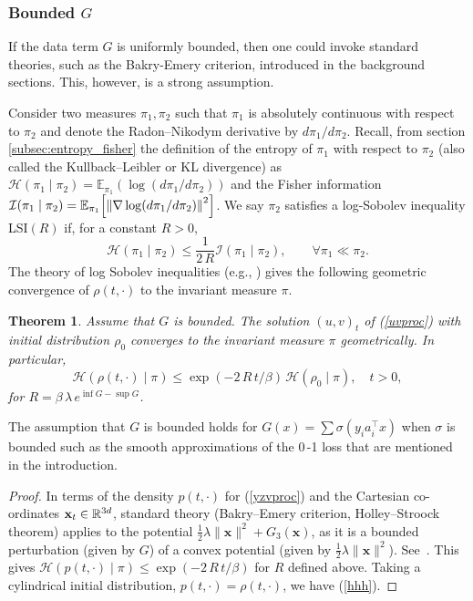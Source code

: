 \documentclass[11pt, twoside]{report}
\newtheorem{theorem}{Theorem}[section]
\renewcommand{\vec}[1]{{\mathbf{#1}}}
\begin{document}
\subsubsection{Bounded \texorpdfstring{$G$}{G}}
If the data term $G$ is uniformly bounded, then one could invoke standard theories, such as the Bakry-Emery criterion, introduced in the background sections. This, however, is a strong assumption.

Consider two measures $\pi_1,\pi_2$ such that $\pi_1$ is absolutely continuous with respect to $\pi_2$ and denote the Radon--Nikodym derivative by $d\pi_1/d\pi_2$. Recall, from section \ref{subsec:entropy_fisher} the definition of the entropy of $\pi_1$ with respect to $\pi_2$ (also called the Kullback--Leibler or KL divergence) as $\mathcal H(\pi_1\mid \pi_2)=\mathbb{E}_{\pi_1}(\log(d\pi_1/d\pi_2))$ and the Fisher information $\mathcal I(\pi_1\mid \pi_2)=\mathbb{E}_{\pi_1}\bp{\norm{\nabla \log(d\pi_1/d\pi_2)}^2}$. We say $\pi_2$ satisfies a log-Sobolev inequality LSI$(R)$ if, for a constant $R>0$,
\[\mathcal{H}(\pi_1\mid \pi_2)\le\frac{1}{2\,R} \mathcal{I}(\pi_1\mid \pi_2),\qquad \forall \pi_1\ll \pi_2. 
\]
The theory of log Sobolev inequalities (e.g., \cite{Lelievre2016-hx}) gives the following geometric convergence of $\rho(t,\cdot)$ to the invariant measure $\pi$. 
\begin{theorem} \label{thm_bndd_G} Assume that $G$ is bounded.
    The solution $(u,v)_t$ of (\ref{uvproc}) with initial distribution $\rho_0$ converges to the invariant measure $\pi$ geometrically. In particular, 
    \begin{equation}\mathcal H(\rho(t,\cdot) \mid \pi)\le \exp(-2\,R\,t/\beta)\, \mathcal H(\rho_0 \mid \pi),\quad t>0,
    \label{hhh}\end{equation}
    for $R=\beta\, \lambda\,e^{\inf G-\sup G}$.
\end{theorem}
The assumption that $G$ is bounded holds for  $G(x)=\sum \sigma(y_i a_i^\top x)$ when $\sigma$ is bounded such as the smooth approximations of the 0\,-1 loss that are mentioned in the introduction.
\begin{proof}
 In terms of the density $p(t,\cdot)$ for (\ref{yzvproc}) and the Cartesian co-ordinates $\vec x_t\in \real^{3d}$, standard theory (Bakry--Emery criterion, Holley--Stroock theorem) applies to the potential $\frac 12 \lambda \|\vec x \|^2+G_3(\vec x)$, as it is a bounded perturbation (given by $G$) of a convex potential (given by $\frac12\lambda\|\vec x\|^2$).
 See~\cite[Proposition 2.9]{Lelievre2016-hx}. This gives $\mathcal H(p(t,\cdot) \mid \pi)\le \exp(-2\,R\,t/\beta)$ for $R$ defined above. Taking a cylindrical initial distribution, $p(t,\cdot)=\rho(t,\cdot)$, we have (\ref{hhh}).
\end{proof}
\end{document}
